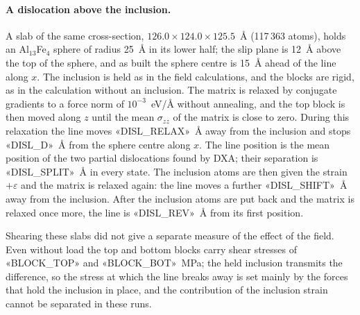 \paragraph{A dislocation above the inclusion.} A slab of the same cross-section,
$126.0\times124.0\times125.5$~\AA{} (117\,363 atoms), holds an Al$_{13}$Fe$_4$
sphere of radius 25~\AA{} in its lower half; the slip plane is 12~\AA{} above
the top of the sphere, and as built the sphere centre is 15~\AA{} ahead of the
line along $x$. The inclusion is held as in the field calculations, and the
blocks are rigid, as in the calculation without an inclusion. The matrix is relaxed by conjugate gradients to a force norm
of $10^{-3}$~eV/\AA{} without annealing, and the top block is then moved along
$z$ until the mean $\sigma_{zz}$ of the matrix is close to zero. During this
relaxation the line moves «DISL_RELAX»~\AA{} away from the inclusion and stops
«DISL_D»~\AA{} from the sphere centre along $x$. The line position is the mean
position of the two partial dislocations found by DXA; their separation is
«DISL_SPLIT»~\AA{} in every state. The inclusion atoms are then given the strain
$+\varepsilon$ and the matrix is relaxed again: the line moves a further
«DISL_SHIFT»~\AA{} away from the inclusion. After the inclusion atoms are put
back and the matrix is relaxed once more, the line is «DISL_REV»~\AA{} from
its first position.

Shearing these slabs did not give a separate measure of the effect of the
field. Even without load the top and bottom blocks carry shear stresses of
«BLOCK_TOP» and «BLOCK_BOT»~MPa; the held inclusion transmits the difference,
so the stress at which the line breaks away is set mainly by the forces that
hold the inclusion in place, and the contribution of the inclusion strain
cannot be separated in these runs.
